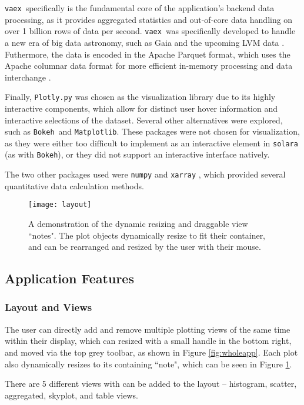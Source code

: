 \documentclass[a4paper,10pt,twocolumn]{article}
\newcommand{\solara}{\texttt{solara}}
\newcommand{\vaex}{\texttt{vaex}}
\begin{document}
\vaex\, specifically is the fundamental core of the application's backend data processing, as it provides aggregated statistics and out-of-core data handling on over 1 billion rows of data per second. \vaex\, was specifically developed to handle a new era of big data astronomy, such as Gaia and the upcoming LVM data \parencite{vaex}. Futhermore, the data is encoded in the Apache Parquet format, which uses the Apache columnar data format for more efficient in-memory processing and data interchange \parencite{parquet}.

Finally, \texttt{Plotly.py} was chosen as the visualization library due to its highly interactive components, which allow for distinct user hover information and interactive selections of the dataset. Several other alternatives were explored, such as \texttt{Bokeh}\, and \texttt{Matplotlib}. These packages were not chosen for visualization, as they were either too difficult to implement as an interactive element in \solara\, (as with \texttt{Bokeh}), or they did not support an interactive interface natively.

The two other packages used were \texttt{numpy} \parencite{numpy} and \texttt{xarray} \parencite{xarray}, which provided several quantitative data calculation methods.

\begin{figure}[tp]
	\centering
	\texttt{[image: layout]}
	\caption{A demonstration of the dynamic resizing and draggable view ``notes". The plot objects dynamically resize to fit their container, and can be rearranged and resized by the user with their mouse.}
	\label{fig:layout}
\end{figure}


\subsection{Application Features}
\label{sec:features}
\subsubsection{Layout and Views}
\label{sec:sticky}
The user can directly add and remove multiple plotting views of the same time within their display, which can resized with a small handle in the bottom right, and moved via the top grey toolbar, as shown in Figure \ref{fig:wholeapp}. Each plot also dynamically resizes to its containing ``note", which can be seen in Figure \ref{fig:layout}.

There are 5 different views with can be added to the layout -- histogram, scatter, aggregated, skyplot, and table views.
\end{document}
